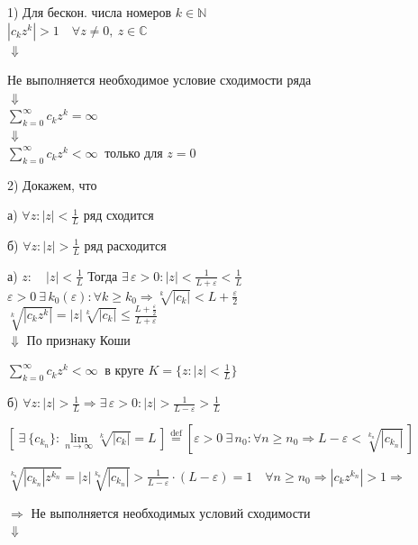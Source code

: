 \documentclass[a4paper,12pt]{article} %
\begin{document}
1) Для бескон. числа номеров $k \in \mathbb{N}$ \\
\indent$|c_k z^k| > 1 \quad \forall z \neq 0, \  z \in \mathbb{C}$ \\
\hspace*{3 cm} $\Downarrow$

Не выполняется необходимое условие сходимости ряда \\
\hspace*{3 cm} $\Downarrow$\\
\hspace*{2 cm} $\sum\limits_{k = 0}^\infty c_k z^k = \infty $\\
\hspace*{3 cm} $\Downarrow$\\
\hspace*{1.9 cm} $\sum\limits_{k = 0}^\infty c_k z^k < \infty \ $ только для $z = 0$

2) Докажем, что

а) $\forall z: |z| < \frac{1}{L}$ ряд сходится

б) $\forall z: |z| > \frac{1}{L}$ ряд расходится

а) $z: \quad |z| < \frac{1}{L}$
Тогда $\exists \, \varepsilon > 0: |z| < \frac{1}{L + \varepsilon} < \frac{1}{L} $\\

$\varepsilon > 0 \  \exists \, k_0(\varepsilon): \forall k \geqslant k_0 \Rightarrow \sqrt[k]{|c_k|} < L + \frac{\varepsilon}{2}
$ \\
$ \sqrt[k]{|c_k z^k|} = |z| \sqrt[k]{|c_k|} \leqslant \frac{L + \frac{\varepsilon}{2}}{L + \varepsilon}
$\\

$\Downarrow$ По признаку Коши

$\sum\limits_{k = 0}^\infty c_k z^k < \infty \ $ в круге $K = \{z: |z| < \frac{1}{L}\}$

б) $\forall z: |z| > \frac{1}{L} \Rightarrow \exists \, \varepsilon > 0: |z| > \frac{1}{L - \varepsilon} > \frac{1}{L} $

$[\   \exists \  \{c_{k_n}\} : \lim\limits_{n \to \infty} \sqrt[k]{|c_k|} = L \,] \stackrel{\text{def}}{=} [\varepsilon > 0 \  \exists \, n_0 : \forall n \geqslant n_0 \Rightarrow L - \varepsilon < \sqrt[k_n]{|c_{k_n}|} \,]$ 

$\sqrt[k_n]{|c_{k_n}| z^{k_n}} = |z| \sqrt[k_n]{|c_{k_n}|} > \frac{1}{L - \varepsilon} \cdot (L - \varepsilon) = 1 \quad \forall n \geqslant n_0  \Rightarrow |c_k z^{k_n}| > 1 \Rightarrow$

$\Rightarrow$ Не выполняется необходимых условий сходимости \\
\hspace*{3 cm} $\Downarrow$
\end{document}
